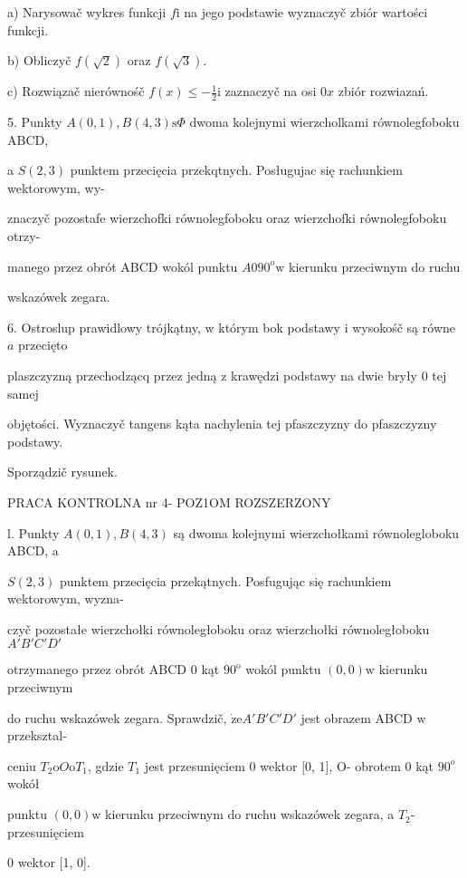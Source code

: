 \documentclass[a4paper,12pt]{article}
\begin{document}
a) Narysowač wykres funkcji $f\mathrm{i}$ na jego podstawie wyznaczyč zbiór wartości funkcji.

b) Obliczyč $f(\sqrt{2})$ oraz $f(\sqrt{3}).$

c) Rozwiązač nierównośč $f(x)\displaystyle \leq-\frac{1}{2}\mathrm{i}$ zaznaczyč na osi $0x$ zbiór rozwiazań.

5. Punkty $A(0,1), B(4,3) \mathrm{s}\Phi$ dwoma kolejnymi wierzcholkami równolegfoboku ABCD,

a $S(2,3)$ punktem przecięcia przekqtnych. Posługujac się rachunkiem wektorowym, wy-

znaczyč pozostafe wierzchofki równolegfoboku oraz wierzchofki równolegfoboku otrzy-

manego przez obrót ABCD wokól punktu $A090^{\mathrm{o}} \mathrm{w}$ kierunku przeciwnym do ruchu

wskazówek zegara.

6. Ostroslup prawidlowy trójkątny, $\mathrm{w}$ którym bok podstawy $\mathrm{i}$ wysokośč są równe $a$ przecięto

plaszczyzną przechodzącq przez jedną $\mathrm{z}$ krawędzi podstawy na dwie bryły $0$ tej samej

objętości. Wyznaczyč tangens kąta nachylenia tej pfaszczyzny do pfaszczyzny podstawy.

Sporządzič rysunek.




PRACA KONTROLNA nr 4- POZ1OM ROZSZERZONY

l. Punkty $A(0,1), B(4,3)$ są dwoma kolejnymi wierzchołkami równolegloboku ABCD, $\mathrm{a}$

$S(2,3)$ punktem przecięcia przekątnych. Posfugując się rachunkiem wektorowym, wyzna-

czyč pozostałe wierzchołki równoległoboku oraz wierzchołki równoległoboku $A'B'C'D'$

otrzymanego przez obrót ABCD $0$ kąt $90^{\mathrm{o}}$ wokól punktu $(0,0)\mathrm{w}$ kierunku przeciwnym

do ruchu wskazówek zegara. Sprawdzič, $\dot{\mathrm{z}}\mathrm{e}A'B'C'D'$ jest obrazem ABCD $\mathrm{w}$ przeksztal-

ceniu $T_{2}\mathrm{o}O\mathrm{o}T_{1}$, gdzie $T_{1}$ jest przesunięciem $0$ wektor $[0$, 1$]$, O- obrotem $0$ kąt $90^{o}$ wokół

punktu $(0,0)\mathrm{w}$ kierunku przeciwnym do ruchu wskazówek zegara, a $T_{2}$- przesunięciem

$0$ wektor [1, 0].
\end{document}
